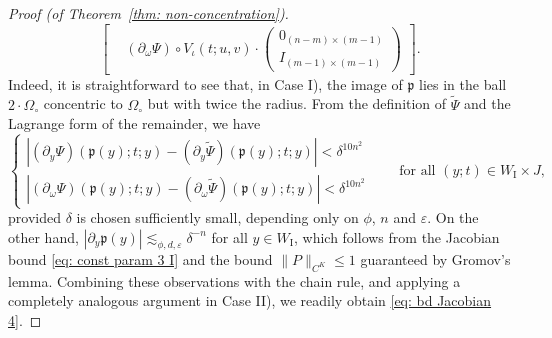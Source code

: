 \documentclass[reqno]{amsart}
\numberwithin{equation}{section}
\newcommand{\fp}{\mathfrak{p}}
\theoremstyle{plain}
\theoremstyle{definition}
\newcommand{\tI}{\mathrm{I}}
\begin{document}
\begin{proof}[Proof (of Theorem~\ref{thm: non-concentration})]
\begin{equation*}
\begin{bmatrix}
& (\partial_\omega\Psi)\circ V_{\iota}(t;u,v)\cdot
\begin{pmatrix}
    0_{(n-m)\times (m-1)}\\
    I_{(m-1)\times (m-1)}
\end{pmatrix}
\end{bmatrix}.
\end{equation*}
Indeed, it is straightforward to see that, in Case I), the image of $\fp$ lies in the ball $2 \cdot \Omega_{\circ}$ concentric to $\Omega_{\circ}$ but with twice the radius. From the definition of $\widetilde{\Psi}$ and the Lagrange form of the remainder, we have
\begin{equation}\label{eq:approx of Psi}
   \begin{cases}
        |(\partial_y\Psi)(\fp(y); t; y) - (\partial_y\widetilde{\Psi})(\fp(y); t; y)| < \delta^{10n^2} \\
         |(\partial_\omega\Psi)(\fp(y); t; y) - (\partial_\omega\widetilde{\Psi})(\fp(y); t; y)| < \delta^{10n^2} 
   \end{cases} \qquad \textrm{for all $(y;t) \in W_{\tI} \times J$,}
\end{equation}
provided $\delta$ is chosen sufficiently small, depending only on $\phi$, $n$ and $\varepsilon$. On the other hand, $|\partial_y \fp(y)| \lesssim_{\phi, d, \varepsilon} \delta^{-n}$ for all $y \in W_{\tI}$, which follows from the Jacobian bound \eqref{eq: const param 3 I} and the bound $\|P\|_{C^K} \leq 1$ guaranteed by Gromov's lemma. Combining these observations with the chain rule, and applying a completely analogous argument in Case II), we readily obtain \eqref{eq: bd Jacobian 4}. 


\end{proof}
\end{document}
